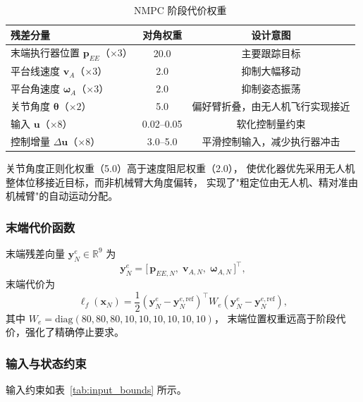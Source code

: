 \begin{table}[h]
\centering
\caption{NMPC 阶段代价权重}
\label{tab:mpc_weights}
\begin{tabular}{lcc}
\hline
\textbf{残差分量} & \textbf{对角权重} & \textbf{设计意图} \\
\hline
末端执行器位置 $\mathbf{p}_{EE}$（$\times 3$）     & 20.0       & 主要跟踪目标 \\
平台线速度 $\mathbf{v}_A$（$\times 3$）             & 2.0        & 抑制大幅移动 \\
平台角速度 $\boldsymbol{\omega}_A$（$\times 3$）    & 2.0        & 抑制姿态振荡 \\
关节角度 $\boldsymbol{\theta}$（$\times 2$）        & 5.0        & 偏好臂折叠，由无人机飞行实现接近 \\
输入 $\mathbf{u}$（$\times 8$）                    & 0.02--0.05 & 软化控制量约束 \\
控制增量 $\Delta\mathbf{u}$（$\times 8$）          & 3.0--5.0   & 平滑控制输入，减少执行器冲击 \\
\hline
\end{tabular}
\end{table}

关节角度正则化权重（5.0）高于速度阻尼权重（2.0），
使优化器优先采用无人机整体位移接近目标，而非机械臂大角度偏转，
实现了"粗定位由无人机、精对准由机械臂"的自动运动分配。

\subsubsection{末端代价函数}

末端残差向量 $\mathbf{y}_N^e\in\mathbb{R}^{9}$ 为
\begin{equation}
    \mathbf{y}_N^e = \bigl[\,\mathbf{p}_{EE,N},\;\mathbf{v}_{A,N},\;\boldsymbol{\omega}_{A,N}\,\bigr]^\top,
\end{equation}
末端代价为
\begin{equation}
    \ell_f(\mathbf{x}_N)
    = \frac{1}{2}(\mathbf{y}_N^e - \mathbf{y}_N^{e,\mathrm{ref}})^\top W_e
    (\mathbf{y}_N^e - \mathbf{y}_N^{e,\mathrm{ref}}),
\end{equation}
其中 $W_e = \mathrm{diag}(80,80,80,10,10,10,10,10,10)$，
末端位置权重远高于阶段代价，强化了精确停止要求。

\subsubsection{输入与状态约束}

输入约束如表~\ref{tab:input_bounds} 所示。

